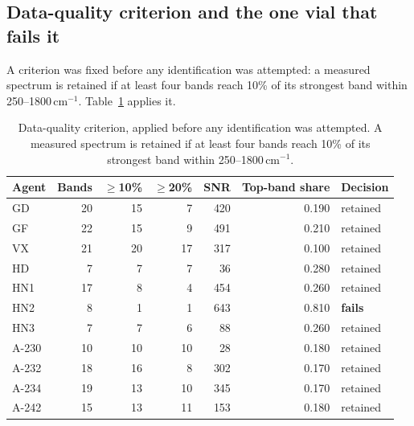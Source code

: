 \documentclass[11pt]{article}
\newcommand*\wn{\ensuremath{\text{cm}^{-1}}}
\begin{document}
\subsection{Data-quality criterion and the one vial that fails it}

A criterion was fixed before any identification was attempted: a measured spectrum is
retained if at least four bands reach 10\% of its strongest band within
250--1800\,\wn{}. Table~\ref{tab:si-quality} applies it.

\begin{table}[htbp]
\centering
\caption{Data-quality criterion, applied before any identification was attempted. A measured spectrum is retained if at least four bands reach 10\% of its strongest band within 250--1800\,\wn{}.}
\label{tab:si-quality}
\small
\begin{tabular}{lrrrrrl}
\toprule
Agent & Bands & $\geq$10\% & $\geq$20\% & SNR & Top-band share & Decision \\
\midrule
GD & 20 & 15 & 7 & 420 & 0.190 & retained \\
GF & 22 & 15 & 9 & 491 & 0.210 & retained \\
VX & 21 & 20 & 17 & 317 & 0.100 & retained \\
HD & 7 & 7 & 7 & 36 & 0.280 & retained \\
HN1 & 17 & 8 & 4 & 454 & 0.260 & retained \\
HN2 & 8 & 1 & 1 & 643 & 0.810 & \textbf{fails} \\
HN3 & 7 & 7 & 6 & 88 & 0.260 & retained \\
A-230 & 10 & 10 & 10 & 28 & 0.180 & retained \\
A-232 & 18 & 16 & 8 & 302 & 0.170 & retained \\
A-234 & 19 & 13 & 10 & 345 & 0.170 & retained \\
A-242 & 15 & 13 & 11 & 153 & 0.180 & retained \\
\bottomrule
\end{tabular}


\end{table}
\end{document}
